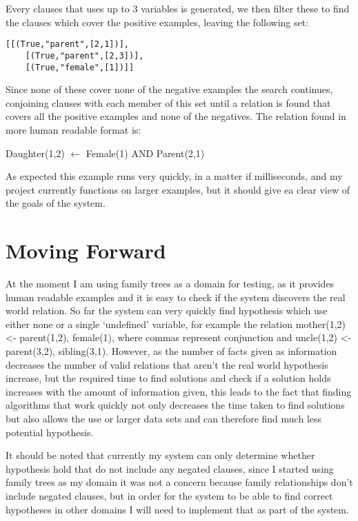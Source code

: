 \documentclass{article}
\begin{document}
Every clauses that uses up to 3 variables is generated, we then filter these to find 
the clauses which cover the positive examples, leaving the following set:

\begin{verbatim}
[[(True,"parent",[2,1])],
    [(True,"parent",[2,3])],
    [(True,"female",[1])]]
\end{verbatim}

Since none of these cover none of the negative examples the search continues, conjoining 
clauses with each member of this set until a relation is found that covers all the positive 
examples and none of the negatives. The relation found in more human readable format is:

Daughter(1,2) $\leftarrow$ Female(1) AND Parent(2,1)

As expected this example runs very quickly, in a matter if milliseconds, and my
project currently functions on larger examples, but it should give ea clear view of
the goals of the system.

\section*{Moving Forward}

At the moment I am using family trees as a domain for testing, as it provides
human readable examples and it is easy to check if the system discovers the
real world relation. So far the system can very quickly find hypothesis
which use either none or a single `undefined' variable, for example the
relation mother(1,2) <- parent(1,2), female(1), where commas represent
conjunction and uncle(1,2) <- parent(3,2), sibling(3,1). However, as the number
of facts given as information decreases the number of valid relations that
aren't the real world hypothesis increase, but the required time to find
solutions and check if a solution holds increases with the amount of information
given, this leads to the fact that finding algorithms that work quickly not
only decreases the time taken to find solutions but also allows the use or
larger data sets and can therefore find much less potential hypothesis.

It should be noted that currently my system can only determine whether
hypothesis hold that do not include any negated clauses, since I started using
family trees as my domain it was not a concern because family relationships
don't include negated clauses, but in order for the system to be able to find
correct hypotheses in other domains I will need to implement that as part of
the system.
\end{document}
